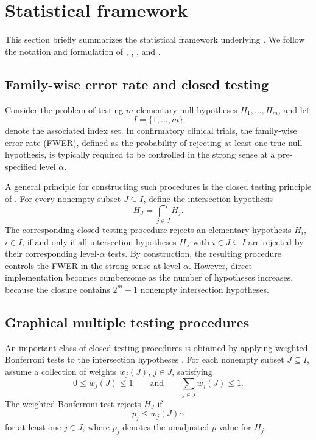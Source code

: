 \documentclass[article]{jss}
\begin{document}

\section{Statistical framework}
\label{sec:framework}

This section briefly summarizes the statistical framework underlying
. We follow the notation and formulation of
\citet{Marcus1976}, \citet{Bretz2009}, \citet{Bretz2011}, and
\citet{MaurerBretz2013}.

\subsection{Family-wise error rate and closed testing}

Consider the problem of testing $m$ elementary null hypotheses
$H_1, \ldots, H_m$, and let
\[
I = \{1, \ldots, m\}
\]
denote the associated index set. In confirmatory clinical trials, the
family-wise error rate (FWER), defined as the probability of rejecting at least
one true null hypothesis, is typically required to be controlled in the strong
sense at a pre-specified level $\alpha$.

A general principle for constructing such procedures is the closed testing
principle of \citet{Marcus1976}. For every nonempty subset $J \subseteq I$,
define the intersection hypothesis
\[
H_J = \bigcap_{j \in J} H_j.
\]
The corresponding closed testing procedure rejects an elementary hypothesis
$H_i$, $i \in I$, if and only if all intersection hypotheses $H_J$ with
$i \in J \subseteq I$ are rejected by their corresponding level-$\alpha$ tests.
By construction, the resulting procedure controls the FWER in the strong sense
at level $\alpha$. However, direct implementation becomes cumbersome as the
number of hypotheses increases, because the closure contains $2^m - 1$
nonempty intersection hypotheses.

\subsection{Graphical multiple testing procedures}

An important class of closed testing procedures is obtained by applying
weighted Bonferroni tests to the intersection hypotheses
\citep{Bretz2009,Bretz2011}. For each nonempty subset $J \subseteq I$, assume
a collection of weights $w_j(J)$, $j \in J$, satisfying
\[
0 \leq w_j(J) \leq 1
\qquad \text{and} \qquad
\sum_{j \in J} w_j(J) \leq 1.
\]
The weighted Bonferroni test rejects $H_J$ if
\[
p_j \leq w_j(J)\alpha
\]
for at least one $j \in J$, where $p_j$ denotes the unadjusted $p$-value for
$H_j$.
\end{document}
